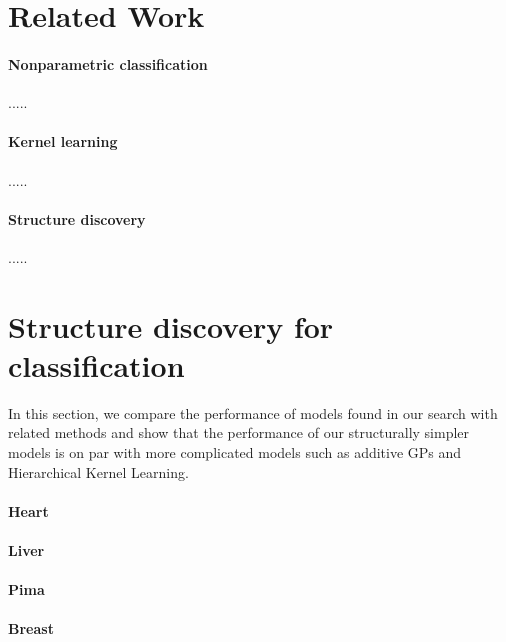 \documentclass[twoside]{article}
\begin{document}
\section{Related Work}

\paragraph{Nonparametric classification}

.....

\paragraph{Kernel learning}

.....

\paragraph{Structure discovery}

.....

\clearpage

\section{Structure discovery for classification}

In this section, we compare the performance of models found in our search with related methods and show that the performance of our structurally simpler models is on par with more complicated models such as additive GPs \cite{duvenaud2011additive11} and Hierarchical Kernel Learning. 



\paragraph{Heart}

\paragraph{Liver}

\paragraph{Pima} 

\paragraph{Breast} 
\end{document}
